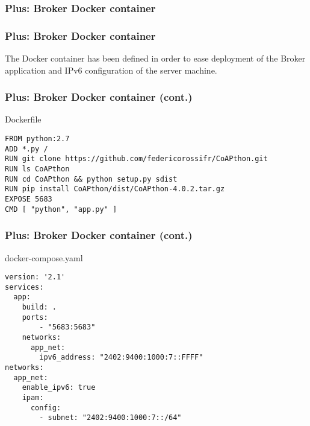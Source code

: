 \documentclass{beamer}
\begin{document}
\subsubsection{Plus: Broker Docker container}
\begin{frame}
\frametitle{Plus: Broker Docker container}
The Docker container has been defined in order to ease deployment of the Broker application and IPv6 configuration of the server machine.
\end{frame}

\begin{frame}[fragile]
\frametitle{Plus: Broker Docker container (cont.)}
\begin{exampleblock}{Dockerfile}
	\begin{Verbatim}[fontsize=\footnotesize]
FROM python:2.7
ADD *.py /
RUN git clone https://github.com/federicorossifr/CoAPthon.git
RUN ls CoAPthon
RUN cd CoAPthon && python setup.py sdist
RUN pip install CoAPthon/dist/CoAPthon-4.0.2.tar.gz
EXPOSE 5683
CMD [ "python", "app.py" ]
	\end{Verbatim}
\end{exampleblock}
\end{frame}

\begin{frame}[fragile]
\frametitle{Plus: Broker Docker container (cont.)}
\begin{exampleblock}{docker-compose.yaml}
	\begin{Verbatim}[fontsize=\footnotesize]
version: '2.1'
services:
  app:
    build: .
    ports:
        - "5683:5683"
    networks:
      app_net:
        ipv6_address: "2402:9400:1000:7::FFFF"
networks:
  app_net:
    enable_ipv6: true
    ipam:
      config:
        - subnet: "2402:9400:1000:7::/64"
	\end{Verbatim}
\end{exampleblock}
\end{frame}
\end{document}
